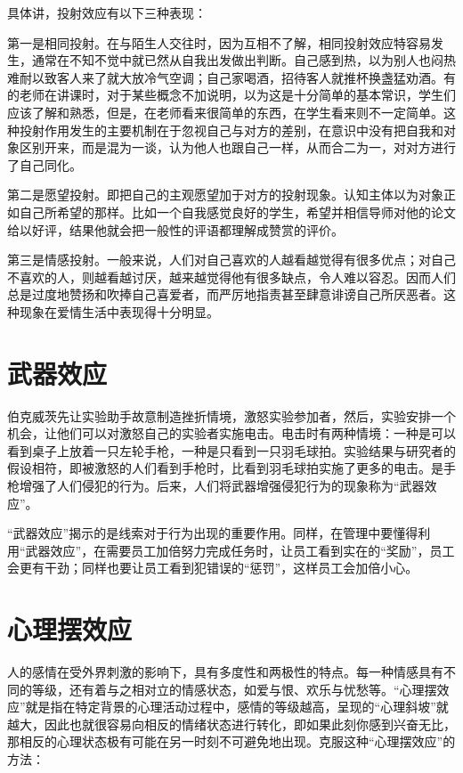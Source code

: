 \documentclass[11pt]{ctexart}
\begin{document}
具体讲，投射效应有以下三种表现：

第一是相同投射。在与陌生人交往时，因为互相不了解，相同投射效应特容易发生，通常在不知不觉中就已然从自我出发做出判断。自己感到热，以为别人也闷热难耐以致客人来了就大放冷气空调；自己家喝酒，招待客人就推杯换盏猛劝酒。有的老师在讲课时，对于某些概念不加说明，以为这是十分简单的基本常识，学生们应该了解和熟悉，但是，在老师看来很简单的东西，在学生看来则不一定简单。这种投射作用发生的主要机制在于忽视自己与对方的差别，在意识中没有把自我和对象区别开来，而是混为一谈，认为他人也跟自己一样，从而合二为一，对对方进行了自己同化。

第二是愿望投射。即把自己的主观愿望加于对方的投射现象。认知主体以为对象正如自己所希望的那样。比如一个自我感觉良好的学生，希望并相信导师对他的论文给以好评，结果他就会把一般性的评语都理解成赞赏的评价。

第三是情感投射。一般来说，人们对自己喜欢的人越看越觉得有很多优点；对自己不喜欢的人，则越看越讨厌，越来越觉得他有很多缺点，令人难以容忍。因而人们总是过度地赞扬和吹捧自己喜爱者，而严厉地指责甚至肆意诽谤自己所厌恶者。这种现象在爱情生活中表现得十分明显。
\section{武器效应}
\label{sec-94}


伯克威茨先让实验助手故意制造挫折情境，激怒实验参加者，然后，实验安排一个机会，让他们可以对激怒自己的实验者实施电击。电击时有两种情境：一种是可以看到桌子上放着一只左轮手枪，一种是只看到一只羽毛球拍。实验结果与研究者的假设相符，即被激怒的人们看到手枪时，比看到羽毛球拍实施了更多的电击。是手枪增强了人们侵犯的行为。后来，人们将武器增强侵犯行为的现象称为“武器效应”。

“武器效应”揭示的是线索对于行为出现的重要作用。同样，在管理中要懂得利用“武器效应”，在需要员工加倍努力完成任务时，让员工看到实在的“奖励”，员工会更有干劲；同样也要让员工看到犯错误的“惩罚”，这样员工会加倍小心。
\section{心理摆效应}
\label{sec-95}


人的感情在受外界刺激的影响下，具有多度性和两极性的特点。每一种情感具有不同的等级，还有着与之相对立的情感状态，如爱与恨、欢乐与忧愁等。“心理摆效应”就是指在特定背景的心理活动过程中，感情的等级越高，呈现的“心理斜坡”就越大，因此也就很容易向相反的情绪状态进行转化，即如果此刻你感到兴奋无比，那相反的心理状态极有可能在另一时刻不可避免地出现。克服这种“心理摆效应”的方法：
\end{document}
